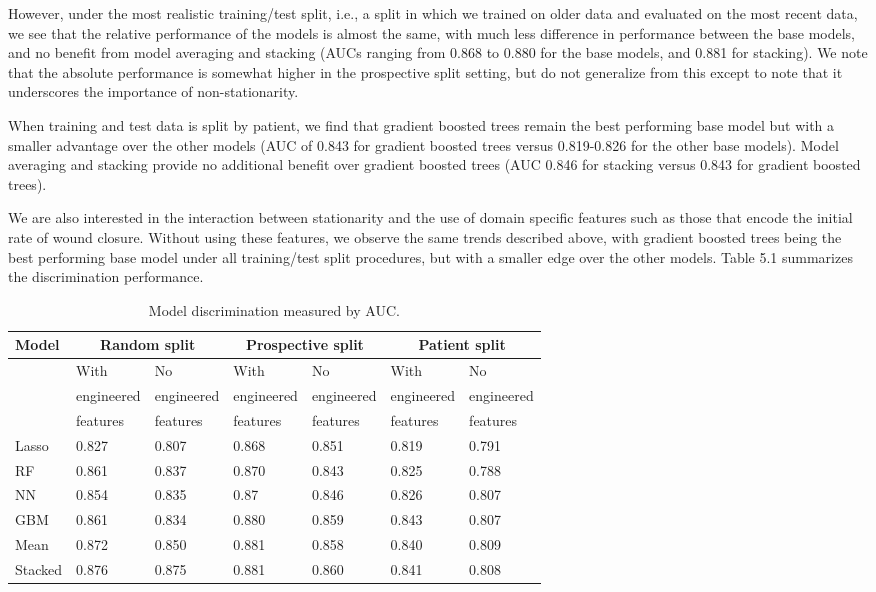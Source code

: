 However, under the most realistic training/test split, i.e., a split
in which we trained on older data and evaluated on the most recent
data, we see that the relative performance of the models is almost the
same, with much less difference in performance between the base
models, and no benefit from model averaging and stacking (AUCs ranging
from 0.868 to 0.880 for the base models, and 0.881 for stacking).  We
note that the absolute performance is somewhat higher in the
prospective split setting, but do not generalize from this except to
note that it underscores the importance of non-stationarity.

When training and test data is split by patient, we find that gradient
boosted trees remain the best performing base model but with a smaller
advantage over the other models (AUC of 0.843 for gradient boosted
trees versus 0.819-0.826 for the other base models).  Model averaging
and stacking provide no additional benefit over gradient boosted trees
(AUC 0.846 for stacking versus 0.843 for gradient boosted trees).

We are also interested in the interaction between stationarity and the
use of domain specific features such as those that encode the initial
rate of wound closure.  Without using these features, we observe the
same trends described above, with gradient boosted trees being the
best performing base model under all training/test split procedures,
but with a smaller edge over the other models.  Table 5.1 summarizes
the discrimination performance.

\begin{table}
\begin{center}
  \begin{tabular}{|l|l|l|l|l|l|l||}
    \hline Model & \multicolumn{2}{|c|}{Random split} &
    \multicolumn{2}{|c|}{Prospective split} &
    \multicolumn{2}{|c|}{Patient split} \\
    \hline \hline
    & With & No & With & No & With & No \\
    & engineered & engineered & engineered & engineered & engineered & engineered \\
    & features & features & features & features & features & features \\
    \hline \hline
    Lasso &  0.827 & 0.807 & 0.868 & 0.851 & 0.819 & 0.791 \\
    RF & 0.861 & 0.837 & 0.870 & 0.843 & 0.825 & 0.788 \\
    NN & 0.854 & 0.835 & 0.87 & 0.846 & 0.826 & 0.807 \\
    GBM & 0.861 & 0.834 & 0.880 & 0.859 & 0.843 & 0.807 \\
    Mean & 0.872 & 0.850 & 0.881 & 0.858 & 0.840 & 0.809 \\
    Stacked & 0.876 & 0.875 & 0.881 & 0.860 & 0.841 & 0.808 \\
    \hline
\end{tabular}
\end{center}
\caption{Model discrimination measured by AUC.}
\end{table}

